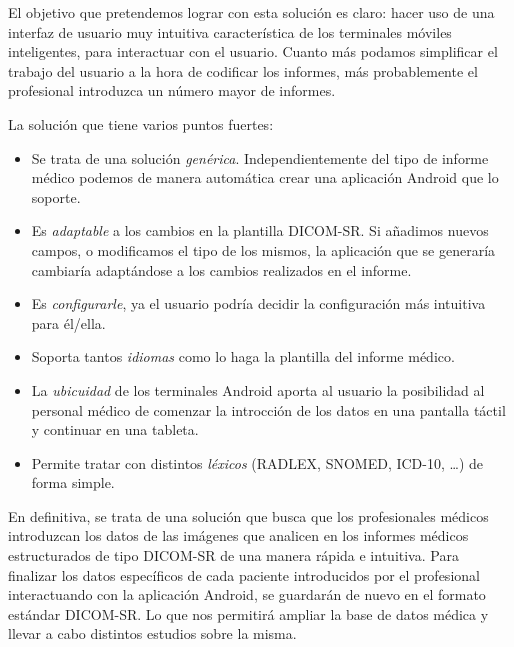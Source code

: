El objetivo que pretendemos lograr con esta solución es claro: hacer uso de una interfaz de usuario muy intuitiva característica de los terminales móviles inteligentes, para interactuar con el usuario. Cuanto más podamos simplificar el trabajo del usuario a la hora de codificar los informes, más probablemente el profesional introduzca un número mayor de informes. \medskip\par
La solución que tiene varios puntos fuertes:
\begin{itemize}
\item Se trata de una solución \textit{genérica}. Independientemente del tipo de informe médico podemos de manera automática crear una aplicación Android que lo soporte.
\item Es \textit{adaptable} a los cambios en la plantilla DICOM-SR. Si añadimos nuevos campos, o modificamos el tipo de los mismos, la aplicación que se generaría cambiaría adaptándose a los cambios realizados en el informe.
\item Es \textit{configurarle}, ya el usuario podría decidir la configuración más intuitiva para él/ella.
\item Soporta tantos \textit{idiomas} como lo haga la plantilla del informe médico. 
\item La \textit{ubicuidad} de los terminales Android aporta al usuario la posibilidad al personal médico de comenzar la introcción de los datos en una pantalla táctil y continuar en una tableta. 
\item Permite tratar con distintos \textit{léxicos} (RADLEX, SNOMED, ICD-10, \ldots) de forma simple. 
\end{itemize}
\medskip\par

En definitiva, se trata de una solución que busca que los profesionales médicos introduzcan los datos de las imágenes que analicen en los informes médicos estructurados de tipo DICOM-SR  de una manera rápida e intuitiva. Para finalizar los datos específicos de cada paciente introducidos por el profesional interactuando con la aplicación Android, se guardarán de nuevo en el formato estándar DICOM-SR. Lo que nos permitirá ampliar la base de datos médica y llevar a cabo distintos estudios sobre la misma. 